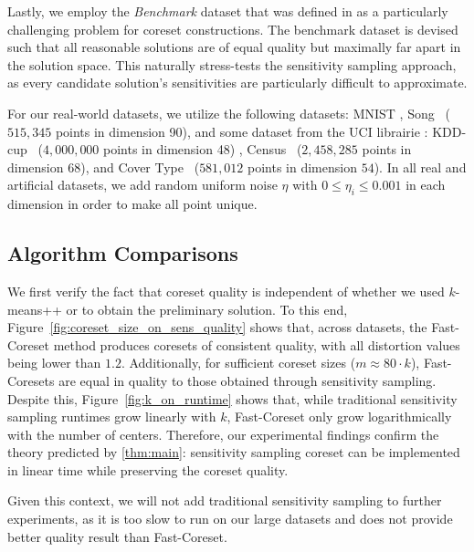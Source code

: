 Lastly, we employ the \emph{Benchmark} dataset that was defined in \cite{chrisESA} as a particularly challenging problem for coreset constructions.  The
benchmark dataset is devised such that all reasonable solutions are of equal quality but maximally far apart in the solution space. This naturally stress-tests
the sensitivity sampling approach, as every candidate solution's sensitivities are particularly difficult to approximate.

For our real-world datasets, we utilize the following datasets: MNIST , Song~\cite{song} ($515, 345$ points in dimension 90), and some dataset from the UCI librairie \cite{Dua:2019}: KDD-cup~\cite{kddcup} ($4,000,000$ points in dimension 48) , Census~\cite{census} ($2, 458, 285$ points in dimension 68), and Cover Type~\cite{covtype} ($581,012$ points in dimension $54$). 
In all real and
artificial datasets, we add random uniform noise $\eta$ with $0 \leq \eta_i \leq 0.001$ in each dimension in order to make all point unique.

\subsection{Algorithm Comparisons}
\label{ssec:alg_qualities}

We first verify the fact that coreset quality is independent of whether we used $k$-means++ or \fkmeans to obtain the preliminary solution. To this end,
Figure~\ref{fig:coreset_size_on_sens_quality} shows that, across datasets, the Fast-Coreset method produces coresets of consistent quality, with all distortion
values being lower than $1.2$. Additionally, for sufficient coreset sizes ($m \approx 80\cdot k$), Fast-Coresets are equal in quality to those obtained through
sensitivity sampling. Despite this, Figure~\ref{fig:k_on_runtime} shows that, while traditional sensitivity sampling runtimes grow linearly with $k$,
Fast-Coreset only grow logarithmically with the number of centers.
Therefore, our experimental findings confirm the theory predicted by \cref{thm:main}: sensitivity sampling coreset can be implemented in linear time while preserving the coreset quality.

 Given this context, we will not add traditional sensitivity sampling to further experiments, as it is too slow to run on our large datasets and does not provide better quality result than Fast-Coreset.

